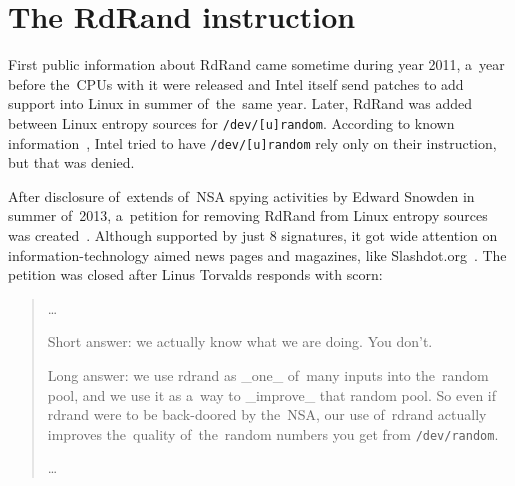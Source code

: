 \chapter{The RdRand instruction}  \label{chap:rdrand-instruction}
\par{
First public information about RdRand came sometime during year 
2011\cite{IntelRdRandFindAbout}, a~year before the~CPUs with it were released
 and Intel itself send patches to add support into Linux in summer of~the~same 
 year\cite{KernelRdRand}. Later, RdRand was added between Linux entropy 
 sources for {\tt /dev/[u]random}. According to known 
 information~\cite{TheodoreTsoNSA}, Intel tried to have {\tt /dev/[u]random} rely
  only on their instruction, but that was denied. 
}

\par{
After disclosure of~extends of~NSA spying activities by Edward Snowden 
in summer of~2013\cite{GuardianNSA,DailymailNSA}, a~petition for removing 
RdRand from Linux entropy sources was created~\cite{PetitionRdRand}. 
Although supported by just 8 signatures, it got wide attention on 
information-technology aimed news pages and magazines, like Slashdot.org~\cite{PetitionRdRandSlashdot}. The petition was closed after Linus Torvalds 
responds with scorn:
}
\begin{quote} \par{\dots}
\par{
Short answer: we actually know what we are doing. You don't.
}
\par{
Long answer: we use rdrand as \_one\_ of~many inputs into the~random pool, 
and we use it as a~way to \_improve\_ that random pool. 
So even if rdrand were to be back-doored by the~NSA, our use of~rdrand 
actually improves the~quality of~the~random numbers you get 
from {\tt /dev/random}.
}
\par{\dots}
\end{quote}

